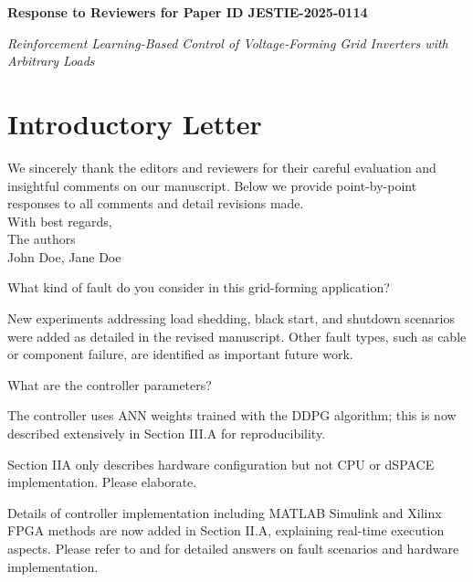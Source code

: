 \documentclass[a4paper,11pt]{article}
\newcommand{\paperid}{JESTIE-2025-0114}
\newcommand{\papertitle}{Reinforcement Learning-Based Control of Voltage-Forming Grid Inverters with Arbitrary Loads}
\begin{document}
\begin{center}
    {\Large \textbf{Response to Reviewers for Paper ID \paperid}}
\end{center}

\begin{center}
    {\large \textit{\papertitle}}
\end{center}

\vspace{1em}

\section*{Introductory Letter}
We sincerely thank the editors and reviewers for their careful evaluation and insightful comments on our manuscript. Below we provide point-by-point responses to all comments and detail revisions made.\\

\noindent With best regards,\\
The authors \\
{John Doe, Jane Doe}


\begin{question}[q:method]
What kind of fault do you consider in this grid-forming application?
\end{question}
\begin{answer}[a:method]
New experiments addressing load shedding, black start, and shutdown scenarios were added as detailed in the revised manuscript. Other fault types, such as cable or component failure, are identified as important future work.
\end{answer}

\begin{question}[q:params]
What are the controller parameters?
\end{question}
\begin{answer}[a:params]
The controller uses ANN weights trained with the DDPG algorithm; this is now described extensively in Section III.A for reproducibility.
\end{answer}


\begin{question}[q:hardware]
Section IIA only describes hardware configuration but not CPU or dSPACE implementation. Please elaborate.
\end{question}
\begin{answer}[a:hardware]
Details of controller implementation including MATLAB Simulink and Xilinx FPGA methods are now added in Section II.A, explaining real-time execution aspects.
Please refer to  and  for detailed answers on fault scenarios and hardware implementation.
\end{answer}
\end{document}
